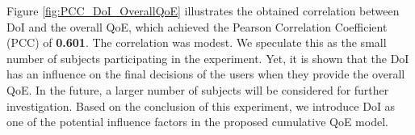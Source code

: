 Figure \ref{fig:PCC_DoI_OverallQoE} illustrates the obtained correlation between DoI and the overall QoE, which achieved the Pearson Correlation Coefficient (PCC) of \textbf{0.601}. The correlation was modest. We speculate this as the small number of subjects participating in the experiment. Yet, it is shown that the DoI has an influence on the final decisions of the users when they provide the overall QoE. In the future, a larger number of subjects will be considered for further investigation. Based on the conclusion of this experiment, we introduce DoI as one of the potential influence factors in the proposed cumulative QoE model.
